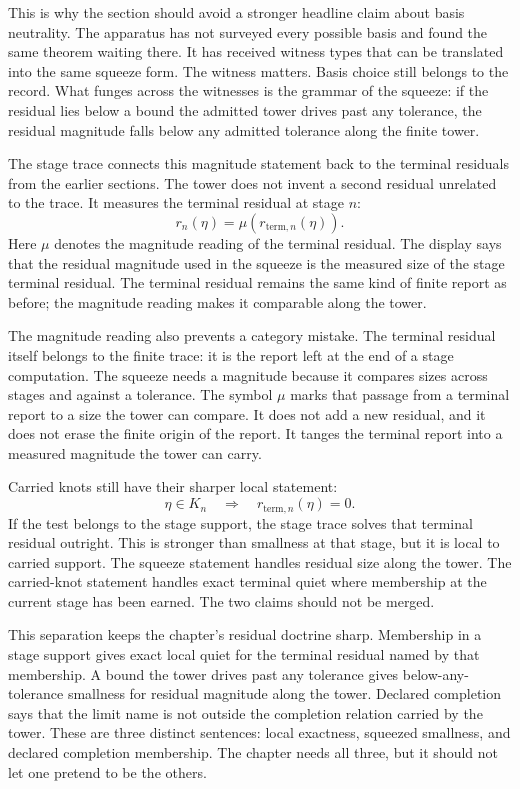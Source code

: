This is why the section should avoid a stronger headline claim about basis
neutrality. The apparatus has not surveyed every possible basis and found the
same theorem waiting there. It has received witness types that can be
translated into the same squeeze form. The witness matters. Basis choice still
belongs to the record. What funges across the witnesses is the grammar of
the squeeze: if the residual lies below a bound the admitted tower drives past any tolerance, the
residual magnitude falls below any admitted tolerance along the finite tower.

The stage trace connects this magnitude statement back to the terminal
residuals from the earlier sections. The tower does not invent a second
residual unrelated to the trace. It measures the terminal residual at stage
\(n\):
\[
  r_n(\eta)
  = \mu\!\left(r_{\mathrm{term},n}(\eta)\right) .
\]
Here \(\mu\) denotes the magnitude reading of the terminal residual. The
display says that the residual magnitude used in the squeeze is the measured
size of the stage terminal residual. The terminal residual remains the same
kind of finite report as before; the magnitude reading makes it comparable
along the tower.

The magnitude reading also prevents a category mistake. The terminal residual
itself belongs to the finite trace: it is the report left at the end of a
stage computation. The squeeze needs a magnitude because it compares sizes
across stages and against a tolerance. The symbol \(\mu\) marks that passage
from a terminal report to a size the tower can compare. It does not add a new
residual, and it does not erase the finite origin of the report. It tanges the
terminal report into a measured magnitude the tower can carry.

Carried knots still have their sharper local statement:
\[
  \eta\in K_n
  \quad\Longrightarrow\quad
  r_{\mathrm{term},n}(\eta)=0 .
\]
If the test belongs to the stage support, the stage trace solves that
terminal residual outright. This is stronger than smallness at that stage,
but it is local to carried support. The squeeze statement handles residual
size along the tower. The carried-knot statement handles exact terminal quiet
where membership at the current stage has been earned. The two claims should
not be merged.

This separation keeps the chapter's residual doctrine sharp. Membership in a
stage support gives exact local quiet for the terminal residual named by that
membership. A bound the tower drives past any tolerance gives below-any-tolerance smallness for residual magnitude
along the tower. Declared completion says that the limit name is not outside
the completion relation carried by the tower. These are three distinct
sentences: local exactness, squeezed smallness, and declared completion
membership. The chapter needs all three, but it should not let one pretend to be
the others.


